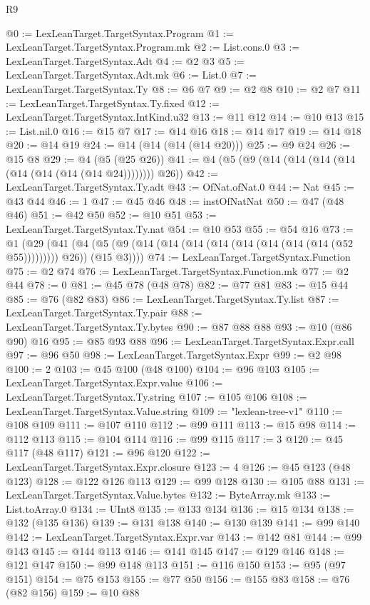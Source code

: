 \begin{lexlean}{R9}
\begin{coremodule}
{{{{{{{{{{{{{{{{{{{{{{{{{{{{{{{{{{{{{{{{{{{{{{{{{{{{{{{{{{{{{{{{{{{{{{{{{{{{{{{{{{{{@0 := LexLeanTarget.TargetSyntax.Program
@1 := LexLeanTarget.TargetSyntax.Program.mk
@2 := List.cons.{0}
@3 := LexLeanTarget.TargetSyntax.Adt
@4 := @2 @3
@5 := LexLeanTarget.TargetSyntax.Adt.mk
@6 := List.{0}
@7 := LexLeanTarget.TargetSyntax.Ty
@8 := @6 @7
@9 := @2 @8
@10 := @2 @7
@11 := LexLeanTarget.TargetSyntax.Ty.fixed
@12 := LexLeanTarget.TargetSyntax.IntKind.u32
@13 := @11 @12
@14 := @10 @13
@15 := List.nil.{0}
@16 := @15 @7
@17 := @14 @16
@18 := @14 @17
@19 := @14 @18
@20 := @14 @19
@24 := @14 (@14 (@14 (@14 @20)))
@25 := @9 @24
@26 := @15 @8
@29 := @4 (@5 (@25 @26))
@41 := @4 (@5 (@9 (@14 (@14 (@14 (@14 (@14 (@14 (@14 (@14 @24)))))))) @26))
@42 := LexLeanTarget.TargetSyntax.Ty.adt
@43 := OfNat.ofNat.{0}
@44 := Nat
@45 := @43 @44
@46 := 1
@47 := @45 @46
@48 := instOfNatNat
@50 := @47 (@48 @46)
@51 := @42 @50
@52 := @10 @51
@53 := LexLeanTarget.TargetSyntax.Ty.nat
@54 := @10 @53
@55 := @54 @16
@73 := @1
    (@29
      (@41 (@4 (@5 (@9 (@14 (@14 (@14 (@14 (@14 (@14 (@14 (@14 (@52 @55))))))))) @26)) (@15 @3))))
@74 := LexLeanTarget.TargetSyntax.Function
@75 := @2 @74
@76 := LexLeanTarget.TargetSyntax.Function.mk
@77 := @2 @44
@78 := 0
@81 := @45 @78 (@48 @78)
@82 := @77 @81
@83 := @15 @44
@85 := @76 (@82 @83)
@86 := LexLeanTarget.TargetSyntax.Ty.list
@87 := LexLeanTarget.TargetSyntax.Ty.pair
@88 := LexLeanTarget.TargetSyntax.Ty.bytes
@90 := @87 @88 @88
@93 := @10 (@86 @90) @16
@95 := @85 @93 @88
@96 := LexLeanTarget.TargetSyntax.Expr.call
@97 := @96 @50
@98 := LexLeanTarget.TargetSyntax.Expr
@99 := @2 @98
@100 := 2
@103 := @45 @100 (@48 @100)
@104 := @96 @103
@105 := LexLeanTarget.TargetSyntax.Expr.value
@106 := LexLeanTarget.TargetSyntax.Ty.string
@107 := @105 @106
@108 := LexLeanTarget.TargetSyntax.Value.string
@109 := "lexlean-tree-v1"
@110 := @108 @109
@111 := @107 @110
@112 := @99 @111
@113 := @15 @98
@114 := @112 @113
@115 := @104 @114
@116 := @99 @115
@117 := 3
@120 := @45 @117 (@48 @117)
@121 := @96 @120
@122 := LexLeanTarget.TargetSyntax.Expr.closure
@123 := 4
@126 := @45 @123 (@48 @123)
@128 := @122 @126 @113
@129 := @99 @128
@130 := @105 @88
@131 := LexLeanTarget.TargetSyntax.Value.bytes
@132 := ByteArray.mk
@133 := List.toArray.{0}
@134 := UInt8
@135 := @133 @134
@136 := @15 @134
@138 := @132 (@135 @136)
@139 := @131 @138
@140 := @130 @139
@141 := @99 @140
@142 := LexLeanTarget.TargetSyntax.Expr.var
@143 := @142 @81
@144 := @99 @143
@145 := @144 @113
@146 := @141 @145
@147 := @129 @146
@148 := @121 @147
@150 := @99 @148 @113
@151 := @116 @150
@153 := @95 (@97 @151)
@154 := @75 @153
@155 := @77 @50
@156 := @155 @83
@158 := @76 (@82 @156)
@159 := @10 @88
}}}}}}}}}}}}}}}}}}}}}}}}}}}}}}}}}}}}}}}}}}}}}}}}}}}}}}}}}}}}}}}}}}}}}}}}}}}}}}}}}}}}
\end{coremodule}
\end{lexlean}
